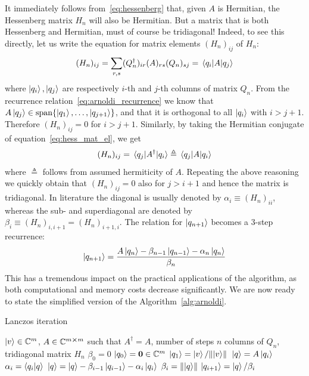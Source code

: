 It immediately follows from~\eqref{eq:hessenberg} that, given \(A\) is Hermitian, the Hessenberg matrix
\(H_n\) will also be Hermitian. But a matrix that is both Hessenberg and Hermitian, must of course be tridiagonal!
Indeed, to see this directly, let us write the equation for matrix elements \((H_n)_{ij}\) of \(H_n\):
\begin{equation}
	(H_n)_{ij} = \sum_{r,s}(Q_n^{\dagger})_{ir}(A)_{rs}(Q_n)_{sj} = \matrixel{q_i}{A}{q_j}
	\label{eq:hess_mat_el}
\end{equation}
where \(\ket{q_i},\ket{q_j}\) are respectively \(i\)-th and \(j\)-th columns of matrix \(Q_n\). From
the recurrence relation~\eqref{eq:arnoldi_recurrence} we know that
\(A\ket{q_j} \in \mathrm{span}\{\ket{q_1},\ldots,\ket{q_{j+1}}\}\), and that it is orthogonal to all
\(\ket{q_i}\) with \(i > j+1\). Therefore \((H_n)_{ij} = 0\) for \(i>j+1\). Similarly, by taking the Hermitian conjugate
of equation~\eqref{eq:hess_mat_el}, we get
\begin{equation}
	(H_n)_{ij} = \matrixel{q_j}{A^{\dagger}}{q_i} \triangleq  \matrixel{q_j}{A}{q_i}
\end{equation}
where \(\triangleq\) follows from assumed hermiticity of \(A\). Repeating the above reasoning we
quickly obtain that \((H_n)_{ij} = 0\) also for \(j > i+1\) and hence the matrix is tridiagonal.
In literature the diagonal is usually denoted by \(\alpha_i \equiv (H_n)_{ii}\), whereas the sub- and superdiagonal
are denoted by \(\beta_i \equiv (H_n)_{i,i+1} = (H_n)_{i+1,i}\). The relation for \(\ket{q_{n+1}}\) becomes
a \(3\)-step recurrence:
\begin{equation}
	\ket{q_{n+1}} = \frac{A \ket{q_n} - \beta_{n-1}\ket{q_{n-1}} - \alpha_n \ket{q_n}}{\beta_n}
	\label{eq:lanczos_recurrence}
\end{equation}
This has a tremendous impact on the practical applications of the algorithm, as both
computational and memory costs decrease significantly. We are now ready to state the simplified version of
the Algorithm~\ref{alg:arnoldi}.
\begin{algorithm}
	\algrenewcommand{}
	\algrenewcommand{}
	\caption{Lanczos iteration}
	\label{alg:lanczos}
	\begin{algorithmic}[1]
		\Require  \(\ket{v} \in \mathbb{C}^m\), \(A \in \mathbb{C}^{m\cross m}\) such that \(A^{\dagger} = A\), number of steps \(n\)
		\Ensure columns of \(Q_n\), tridiagonal matrix \(H_n\)
		\State \(\beta_0 = 0\)
		\State \(\ket{q_0} = \vectorbold{0} \in \CC^m\)
		\State \(\ket{q_1} = \ket{v}/\norm*{\ket{v}}\)
		\State \(\ket{q} = A\ket{q_i}\)
		\State \(\alpha_i = \braket{q_i}{q}\)
		\State \(\ket{q} = \ket{q} - \beta_{i-1}\ket{q_{i-1}} - \alpha_i \ket{q_i}\)
		\State \(\beta_i = \norm{\ket{q}} \)
		\State \(\ket{q_{i+1}} = \ket{q}/\beta_i \)
		\EndFor
	\end{algorithmic}
\end{algorithm}

